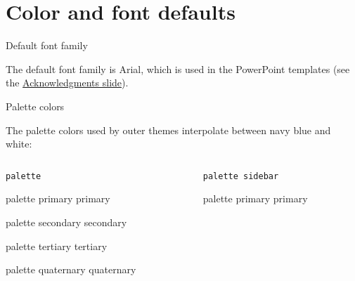 \documentclass{beamer}
\begin{document}
\section{Color and font defaults}


\begin{frame}{Default font family}

The default font family is Arial, which is used in the PowerPoint templates (see the \hyperlink{slide:acknowledgments}{Acknowledgments slide}).

\end{frame}


\begin{frame}[fragile]{Palette colors}

The palette colors used by outer themes interpolate between navy blue and white:

\vfill

\begin{columns}
\begin{column}{.5\textwidth}

\centering
\verb|palette|
\vspace{1ex}

\begin{beamercolorbox}[sep=4pt,center]{palette primary}
primary
\end{beamercolorbox}

\begin{beamercolorbox}[sep=4pt,center]{palette secondary}
secondary
\end{beamercolorbox}

\begin{beamercolorbox}[sep=4pt,center]{palette tertiary}
tertiary
\end{beamercolorbox}

\begin{beamercolorbox}[sep=4pt,center]{palette quaternary}
quaternary
\end{beamercolorbox}

\end{column}
\begin{column}{.5\textwidth}

\centering
\verb|palette sidebar|
\vspace{1ex}

\begin{beamercolorbox}[sep=4pt,center]{palette primary}
primary
\end{beamercolorbox}


\end{column}
\end{columns}
\end{frame}
\end{document}
